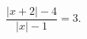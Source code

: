 \begin{ex}[type=equation]
	\begin{condition}
		$\dfrac{\big|x + 2\big| - 4}{\big|x\big| - 1} = 3.$
	\end{condition}
\end{ex}
